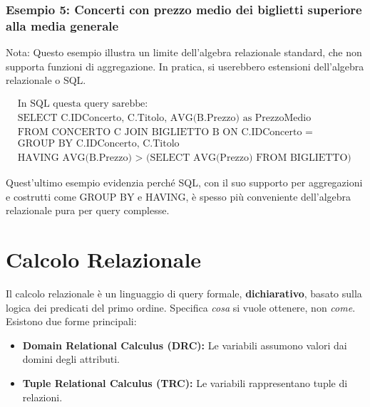 	\subsubsection{Esempio 5: Concerti con prezzo medio dei biglietti superiore alla media generale}
	
	Nota: Questo esempio illustra un limite dell'algebra relazionale standard, che non supporta funzioni di aggregazione. In pratica, si userebbero estensioni dell'algebra relazionale o SQL.
	
	\begin{align*}
		& \text{In SQL questa query sarebbe:} \\
		& \text{SELECT C.IDConcerto, C.Titolo, AVG(B.Prezzo) as PrezzoMedio} \\
		& \text{FROM CONCERTO C JOIN BIGLIETTO B ON C.IDConcerto = B.IDConcerto} \\
		& \text{GROUP BY C.IDConcerto, C.Titolo} \\
		& \text{HAVING AVG(B.Prezzo) > (SELECT AVG(Prezzo) FROM BIGLIETTO)}
	\end{align*}
	
	\noindent Quest'ultimo esempio evidenzia perché SQL, con il suo supporto per aggregazioni e costrutti come GROUP BY e HAVING, è spesso più conveniente dell'algebra relazionale pura per query complesse.
	
	\section{Calcolo Relazionale}
	Il calcolo relazionale è un linguaggio di query formale, \textbf{dichiarativo}, basato sulla logica dei predicati del primo ordine. Specifica \textit{cosa} si vuole ottenere, non \textit{come}.
	Esistono due forme principali:
	\begin{itemize}
		\item \textbf{Domain Relational Calculus (DRC):} Le variabili assumono valori dai domini degli attributi.
		\item \textbf{Tuple Relational Calculus (TRC):} Le variabili rappresentano tuple di relazioni.
	\end{itemize}
	
